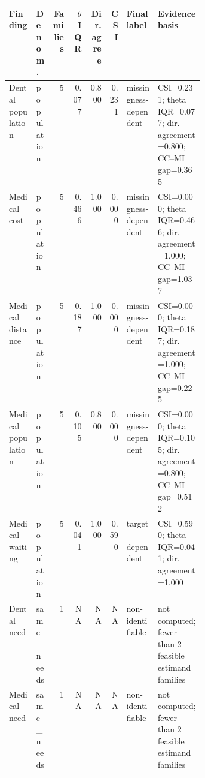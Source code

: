 \begingroup
\scriptsize
\setlength{\tabcolsep}{3pt}
\begin{tabularx}{\linewidth}{@{}p{0.14\linewidth}p{0.08\linewidth}rrrrp{0.16\linewidth}Y@{}}
\toprule
Finding & Denom. & Families & $\theta$ IQR & Dir. agree & CSI & Final label & Evidence basis \\
\midrule
Dental population & population & 5 & 0.077 & 0.800 & 0.231 & missingness-dependent & CSI=0.231; theta IQR=0.077; dir. agreement=0.800; CC--MI gap=0.365 \\
Medical cost & population & 5 & 0.466 & 1.000 & 0.000 & missingness-dependent & CSI=0.000; theta IQR=0.466; dir. agreement=1.000; CC--MI gap=1.037 \\
Medical distance & population & 5 & 0.187 & 1.000 & 0.000 & missingness-dependent & CSI=0.000; theta IQR=0.187; dir. agreement=1.000; CC--MI gap=0.225 \\
Medical population & population & 5 & 0.105 & 0.800 & 0.000 & missingness-dependent & CSI=0.000; theta IQR=0.105; dir. agreement=0.800; CC--MI gap=0.512 \\
Medical waiting & population & 5 & 0.041 & 1.000 & 0.590 & target-dependent & CSI=0.590; theta IQR=0.041; dir. agreement=1.000 \\
Dental need & same\_needs & 1 & NA & NA & NA & non-identifiable & not computed; fewer than 2 feasible estimand families \\
Medical need & same\_needs & 1 & NA & NA & NA & non-identifiable & not computed; fewer than 2 feasible estimand families \\
\bottomrule
\end{tabularx}
\endgroup
